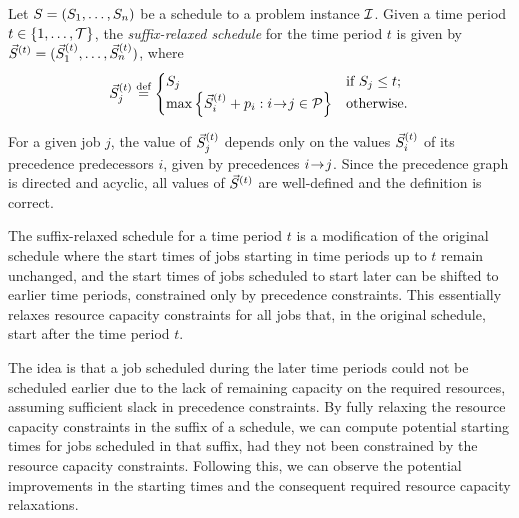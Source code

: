 \begin{defn} \label{def:suffix-relaxed-schedule}
    Let $S = (S_{1}, \dots, S_{n})$ be a schedule to a problem instance $\mathcal{I}$.
    Given a time period $t \in \{{1}, \dots, {\mathcal{T}}\}$,
    the \emph{suffix-relaxed schedule} for the time period $t$ is given by
    $\vec{S}^{(t)} = (\vec{S}^{(t)}_{1}, \dots, \vec{S}^{(t)}_{n})$, where
    $$
    \vec{S}^{(t)}_{j} \overset{\text{def}}{=} \begin{cases}
        S_{j} & \text{if $S_{j} \leq t$;} \\
        \max\left\{\vec{S}^{(t)}_{i} + p_{i}: i \hspace{-0.2em} \rightarrow \hspace{-0.2em} j \in \mathcal{P} \right\} & \text{otherwise.}
    \end{cases}
    $$
\end{defn}

For a given job $j$, the value of $\vec{S}^{(t)}_{j}$
depends only on the values $\vec{S}^{(t)}_{i}$ of its precedence predecessors $i$,
given by precedences $i \hspace{-0.2em} \rightarrow \hspace{-0.2em} j$.
Since the precedence graph is directed and acyclic,
all values of $\vec{S}^{(t)}$ are well-defined and the definition is correct.

The suffix-relaxed schedule for a time period $t$ is a modification of the original schedule
where the start times of jobs starting in time periods up to $t$ remain unchanged,
and the start times of jobs scheduled to start later can be shifted to earlier time periods,
constrained only by precedence constraints.
This essentially relaxes resource capacity constraints for all jobs that, in the original schedule,
start after the time period $t$.

The idea is that a job scheduled during the later time periods could not be scheduled earlier
due to the lack of remaining capacity on the required resources,
assuming sufficient slack in precedence constraints.
By fully relaxing the resource capacity constraints in the suffix of a schedule,
we can compute potential starting times for jobs scheduled in that suffix,
had they not been constrained by the resource capacity constraints.
Following this, we can observe the potential improvements in the starting times
and the consequent required resource capacity relaxations.

